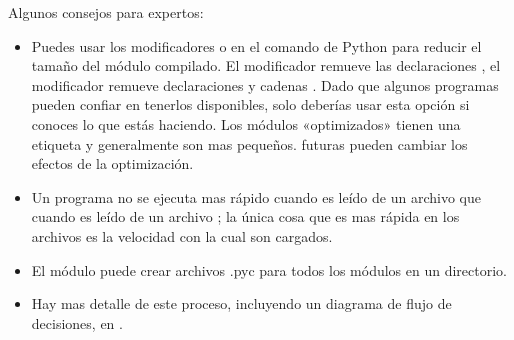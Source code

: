 \documentclass[a5paper,10pt,spanish]{sphinxmanual}
\begin{document}
\sphinxAtStartPar
Algunos consejos para expertos:
\begin{itemize}
\item {} 
\sphinxAtStartPar
Puedes usar los modificadores  o  en el comando de Python para reducir el tamaño del módulo compilado. El modificador  remueve las declaraciones , el modificador  remueve declaraciones  y cadenas . Dado que algunos programas pueden confiar en tenerlos disponibles, solo deberías usar esta opción si conoces lo que estás haciendo. Los módulos «optimizados» tienen una etiqueta  y generalmente son mas pequeños.  futuras pueden cambiar los efectos de la optimización.

\item {} 
\sphinxAtStartPar
Un programa no se ejecuta mas rápido cuando es leído de un archivo  que cuando es leído de un archivo ; la única cosa que es mas rápida en los archivos  es la velocidad con la cual son cargados.

\item {} 
\sphinxAtStartPar
El módulo  puede crear archivos .pyc para todos los módulos en un directorio.

\item {} 
\sphinxAtStartPar
Hay mas detalle de este proceso, incluyendo un diagrama de flujo de decisiones, en .

\end{itemize}
\end{document}
